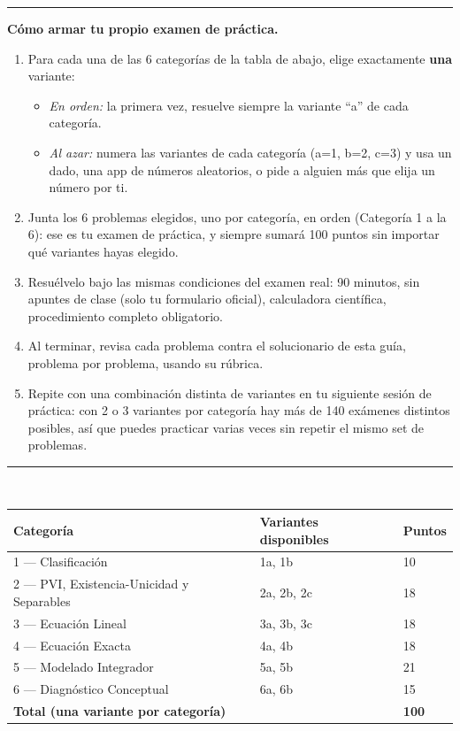 \documentclass[11pt,letterpaper]{article}
\newenvironment{aviso}{%
  \par\vspace{2pt}\hrule\vspace{6pt}
}{%
  \par\vspace{6pt}\hrule\vspace{2pt}
}
\begin{document}
\begin{aviso}
\textbf{Cómo armar tu propio examen de práctica.}
\begin{enumerate}[leftmargin=1.6em, itemsep=3pt, topsep=4pt]
  \item Para cada una de las 6 categorías de la tabla de abajo, elige exactamente \textbf{una} variante:
  \begin{itemize}[leftmargin=1.4em, itemsep=1pt, topsep=2pt]
    \item \emph{En orden:} la primera vez, resuelve siempre la variante ``a'' de cada categoría.
    \item \emph{Al azar:} numera las variantes de cada categoría (a=1, b=2, c=3) y usa un dado, una app de números aleatorios, o pide a alguien más que elija un número por ti.
  \end{itemize}
  \item Junta los 6 problemas elegidos, uno por categoría, en orden (Categoría 1 a la 6): ese es tu examen de práctica, y siempre sumará 100 puntos sin importar qué variantes hayas elegido.
  \item Resuélvelo bajo las mismas condiciones del examen real: 90 minutos, sin apuntes de clase (solo tu formulario oficial), calculadora científica, procedimiento completo obligatorio.
  \item Al terminar, revisa cada problema contra el solucionario de esta guía, problema por problema, usando su rúbrica.
  \item Repite con una combinación distinta de variantes en tu siguiente sesión de práctica: con 2 o 3 variantes por categoría hay más de 140 exámenes distintos posibles, así que puedes practicar varias veces sin repetir el mismo set de problemas.
\end{enumerate}
\end{aviso}

\\[4pt]
\begin{tabular}{lll}
\toprule
Categoría & Variantes disponibles & Puntos \\
\midrule
1 --- Clasificación & 1a, 1b & 10 \\
2 --- PVI, Existencia-Unicidad y Separables & 2a, 2b, 2c & 18 \\
3 --- Ecuación Lineal & 3a, 3b, 3c & 18 \\
4 --- Ecuación Exacta & 4a, 4b & 18 \\
5 --- Modelado Integrador & 5a, 5b & 21 \\
6 --- Diagnóstico Conceptual & 6a, 6b & 15 \\
\midrule
\textbf{Total (una variante por categoría)} & & \textbf{100} \\
\bottomrule
\end{tabular}
\end{document}
